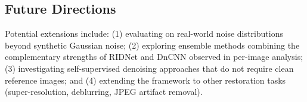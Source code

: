 \subsection{Future Directions}

Potential extensions include: (1) evaluating on real-world noise distributions beyond synthetic Gaussian noise; (2) exploring ensemble methods combining the complementary strengths of RIDNet and DnCNN observed in per-image analysis; (3) investigating self-supervised denoising approaches that do not require clean reference images; and (4) extending the framework to other restoration tasks (super-resolution, deblurring, JPEG artifact removal).
